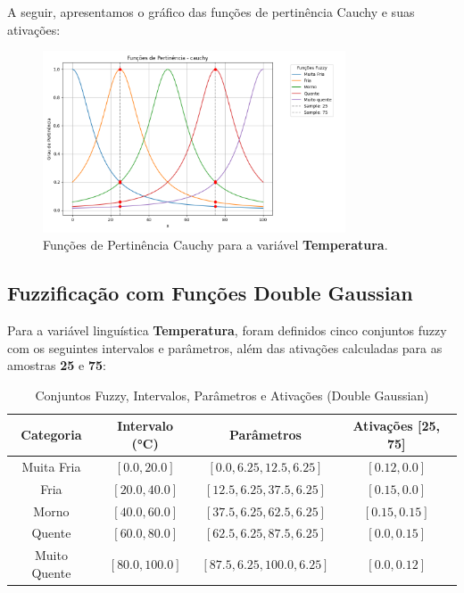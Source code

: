 \documentclass[a4paper,12pt]{article}
\begin{document}
A seguir, apresentamos o gráfico das funções de pertinência Cauchy e suas ativações:

\begin{figure}[H]
    \centering
    \includegraphics[width=0.8\textwidth]{img/funções_de_pertinência_cauchy_fuzzificado.png}
    \caption{Funções de Pertinência Cauchy para a variável \textbf{Temperatura}.}
\end{figure}

\subsection{Fuzzificação com Funções Double Gaussian}

Para a variável linguística \textbf{Temperatura}, foram definidos cinco conjuntos fuzzy com os seguintes intervalos e parâmetros, além das ativações calculadas para as amostras \textbf{25} e \textbf{75}:

\begin{table}[H]
\centering
\caption{Conjuntos Fuzzy, Intervalos, Parâmetros e Ativações (Double Gaussian)}
\begin{tabular}{|c|c|c|c|}
\hline
\textbf{Categoria}    & \textbf{Intervalo (°C)} & \textbf{Parâmetros}               & \textbf{Ativações [25, 75]} \\ \hline
Muita Fria            & $[0.0, 20.0]$          & $[0.0, 6.25, 12.5, 6.25]$         & $[0.12, 0.0]$              \\ \hline
Fria                  & $[20.0, 40.0]$         & $[12.5, 6.25, 37.5, 6.25]$        & $[0.15, 0.0]$              \\ \hline
Morno                 & $[40.0, 60.0]$         & $[37.5, 6.25, 62.5, 6.25]$        & $[0.15, 0.15]$             \\ \hline
Quente                & $[60.0, 80.0]$         & $[62.5, 6.25, 87.5, 6.25]$        & $[0.0, 0.15]$              \\ \hline
Muito Quente          & $[80.0, 100.0]$        & $[87.5, 6.25, 100.0, 6.25]$       & $[0.0, 0.12]$              \\ \hline
\end{tabular}
\end{table}
\end{document}
